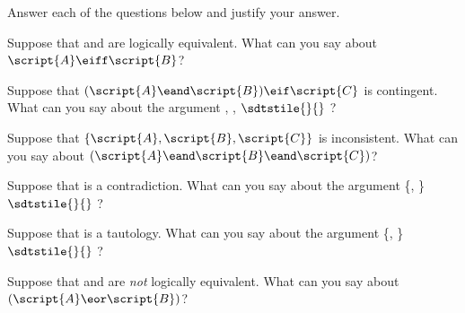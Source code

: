 \noindent\problempart
\label{pr.TT.concepts}
Answer each of the questions below and justify your answer.
\begin{exercises}
\item Suppose that  and  are logically equivalent. What can you say about $\script{A}\eiff\script{B}$?
\item Suppose that $(\script{A}\eand\script{B})\eif\script{C}$ is contingent. What can you say about the argument , , $\sdtstile{}{}$ ?
\item Suppose that $\{\script{A},\script{B}, \script{C}\}$ is inconsistent. What can you say about $(\script{A}\eand\script{B}\eand\script{C})$?
\item Suppose that  is a contradiction. What can you say about the argument \{, \} $\sdtstile{}{}$  ?
\item Suppose that  is a tautology. What can you say about the argument \{, \} $\sdtstile{}{}$ ?
\item Suppose that  and  are \emph{not} logically equivalent. What can you say about $(\script{A}\eor\script{B})$?
\end{exercises}

